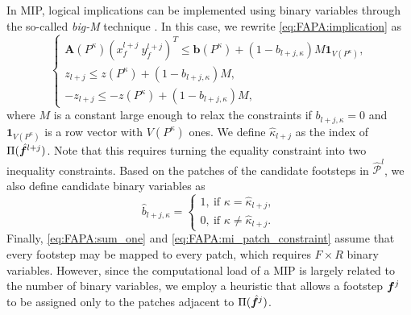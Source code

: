 In MIP, logical implications can be implemented using binary variables through the so-called {\em big-M} technique \cite{Afonso2020}. In this case, we rewrite \eqref{eq:FAPA:implication} as
\begin{equation}
	\begin{cases}
		\bm{A}(P^\kappa)\left( x_f^{l+j} \ y_f^{l+j} \right)^T \leq \bm{b}(P^\kappa) + (1 - b_{l+j,\kappa}) M \bm{1}_{V(P^\kappa)}, \\
		z_{l+j} \leq z(P^\kappa) + (1 - b_{l+j,\kappa}) M, \\
		-z_{l+j} \leq -z(P^\kappa) + (1 - b_{l+j,\kappa}) M,
	\end{cases}
\label{eq:FAPA:mi_patch_constraint}
\end{equation}
where $M$ is a constant large enough to relax the constraints if $b_{l+j,\kappa}=0$ and $\bm{1}_{V(P^\kappa)}$ is a row vector with $V(P^\kappa)$ ones. We define $\hat \kappa_{l+j}$ as the index of $\Pi(\hat {{\bm{f}}}^{l+j})$. Note that this requires turning the equality constraint into two inequality constraints. Based on the patches of the candidate footsteps in $\mathcal{\hat P}^l$, we also define candidate binary variables as
\begin{equation*}
\hat b_{l+j,\kappa} =
\begin{cases}
1, \ \text{if } \kappa = \hat \kappa_{l+j}, \\
0, \ \text{if } \kappa \neq \hat \kappa_{l+j}.
\end{cases}
\end{equation*}
Finally, \eqref{eq:FAPA:sum_one} and \eqref{eq:FAPA:mi_patch_constraint} assume that every footstep may be mapped to every patch, which requires $F \times R$ binary variables. However, since the computational load of a MIP is largely related to the number of binary variables, we employ a heuristic that allows a footstep ${\bm{f}}^j$ to be assigned only to the patches adjacent to $\Pi(\hat {{\bm{f}}}^j)$.


